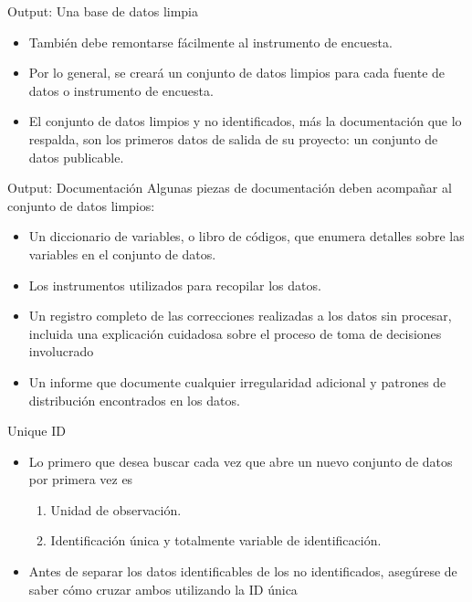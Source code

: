 \documentclass[10pt, aspectratio=169, compress]{beamer}
\begin{document}
\begin{frame}[t]{Output: Una base de datos limpia}
	\begin{itemize}
		\item También debe remontarse fácilmente al instrumento de encuesta.
		\item Por lo general, se creará un conjunto de datos limpios para cada fuente de datos o instrumento de encuesta.
		\item El conjunto de datos limpios y no identificados, más la documentación que lo respalda, son los primeros datos de salida de su proyecto: un conjunto de datos publicable.
	\end{itemize}
\end{frame}
\begin{frame}[t]{Output: Documentación}
	Algunas piezas de documentación deben acompañar al conjunto de datos limpios:
	\begin{itemize}
		\item Un diccionario de variables, o libro de códigos, que enumera detalles sobre las variables en el conjunto de datos.
		\item Los instrumentos utilizados para recopilar los datos.
		\item Un registro completo de las correcciones realizadas a los datos sin procesar, incluida una explicación cuidadosa sobre el proceso de toma de decisiones involucrado
		\item Un informe que documente cualquier irregularidad adicional y patrones de distribución encontrados en los datos.
	\end{itemize}
\end{frame}
\begin{frame}[t]{Unique ID}
	\begin{itemize}
		\item Lo primero que desea buscar cada vez que abre un nuevo conjunto de datos por primera vez es
		\begin{enumerate}
			\item Unidad de observación.
			\item Identificación única y totalmente variable de identificación.
		\end{enumerate}
		\item Antes de separar los datos identificables de los no identificados, asegúrese de saber cómo cruzar ambos utilizando la ID única
	\end{itemize}
\end{frame}
\end{document}
